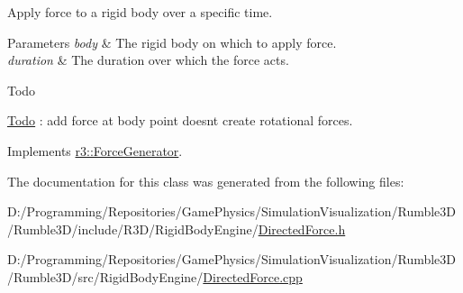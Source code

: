 Apply force to a rigid body over a specific time. 


\begin{DoxyParams}{Parameters}
{\em body} & The rigid body on which to apply force. \\
\hline
{\em duration} & The duration over which the force acts. \\
\hline
\end{DoxyParams}
\begin{DoxyRefDesc}{Todo}
\item[\mbox{\hyperlink{todo__todo000008}{Todo}}]\+: add force at body point doesn\textquotesingle{}t create rotational forces. \end{DoxyRefDesc}


Implements \mbox{\hyperlink{classr3_1_1_force_generator_a59deb54721cdcc6e33fabfb1f9a3fb27}{r3\+::\+Force\+Generator}}.



The documentation for this class was generated from the following files\+:\begin{DoxyCompactItemize}
\item 
D\+:/\+Programming/\+Repositories/\+Game\+Physics/\+Simulation\+Visualization/\+Rumble3\+D/\+Rumble3\+D/include/\+R3\+D/\+Rigid\+Body\+Engine/\mbox{\hyperlink{_directed_force_8h}{Directed\+Force.\+h}}\item 
D\+:/\+Programming/\+Repositories/\+Game\+Physics/\+Simulation\+Visualization/\+Rumble3\+D/\+Rumble3\+D/src/\+Rigid\+Body\+Engine/\mbox{\hyperlink{_directed_force_8cpp}{Directed\+Force.\+cpp}}\end{DoxyCompactItemize}
